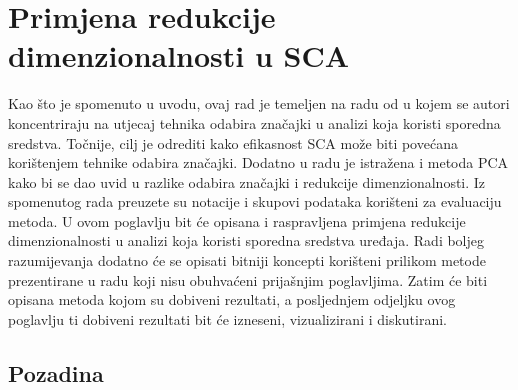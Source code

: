 \documentclass[times, utf8, diplomski]{fer}
\begin{document}
\chapter{Primjena redukcije dimenzionalnosti u SCA}

Kao što je spomenuto u uvodu, ovaj rad je temeljen na radu od \cite{8836108} u kojem se autori koncentriraju na utjecaj tehnika odabira značajki  u analizi koja koristi sporedna sredstva. Točnije, cilj je odrediti kako efikasnost SCA može biti povećana korištenjem tehnike odabira značajki. Dodatno u radu je istražena i metoda PCA kako bi se dao uvid u razlike odabira značajki i redukcije dimenzionalnosti. Iz spomenutog rada preuzete su notacije i skupovi podataka korišteni za evaluaciju metoda. U ovom poglavlju bit će opisana i raspravljena primjena redukcije dimenzionalnosti u analizi koja koristi sporedna sredstva uređaja. Radi boljeg razumijevanja dodatno će se opisati bitniji koncepti korišteni prilikom metode prezentirane u radu koji nisu obuhvaćeni prijašnjim poglavljima. Zatim će biti opisana metoda kojom su dobiveni rezultati, a posljednjem odjeljku ovog poglavlju ti dobiveni rezultati bit će izneseni, vizualizirani i diskutirani.

\section{Pozadina}
\end{document}

